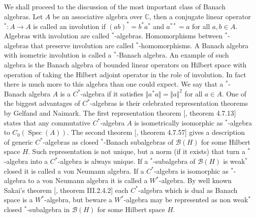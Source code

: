 We shall proceed to the discussion of the most important class of Banach
algebras. Let $A$ be an associative algebra over $\mathbb{C}$, then a conjugate
linear operator ${}^*:A\to A$ is called an involution if ${(ab)}^*=b^*a^*$ and
$a^{**}=a$ for all $a,b\in A$. Algebras with involution are called
${}^*$-algebras. Homomorphisms between ${}^*$-algebras that preserve involution
are called ${}^*$-homomorphisms. A Banach algebra with isometric involution is
called a ${}^*$-Banach algebra. An example of such algebra is the Banach algebra
of bounded linear operators on Hilbert space with operation of taking the
Hilbert adjoint operator in the role of involution. In fact there is much more
to this algebra than one could expect. We say that a ${}^*$-Banach algebra $A$
is a $C^*$-algebra if it satisfies $\Vert a^*a\Vert=\Vert a\Vert^2$ for all
$a\in A$. One of the biggest advantages of $C^*$-algebras is their celebrated
representation theorems by Gelfand and Naimark. The first representation theorem
[\cite{HelBanLocConvAlg}, theorem 4.7.13] states that any commutative
$C^*$-algebra $A$ is isometrically isomorphic as ${}^*$-algebra to
$C_0(\operatorname{Spec}(A))$. The second theorem [\cite{HelBanLocConvAlg},
theorem 4.7.57] gives a description of generic $C^*$-algebras as closed
${}^*$-Banach subalgebras of $\mathcal{B}(H)$ for some Hilbert space $H$. Such
representation is not unique, but a norm (if it exists) that turn a
${}^*$-algebra into a $C^*$-algebra is always unique. If a ${}^*$-subalgebra of
$\mathcal{B}(H)$ is weak${}^*$ closed it is called a von Neumann algebra. If a
$C^*$-algebra is isomorphic as ${}^*$-algebra to a von Neumann algebra it is
called a $W^*$-algebra. By well known Sakai's theorem [\cite{BlackadarOpAlg},
theorem III.2.4.2] each $C^*$-algebra which is dual as Banach space is a
$W^*$-algebra, but beware a $W^*$-algebra may be represented as non weak${}^*$
closed ${}^*$-subalgebra in $\mathcal{B}(H)$ for some Hilbert space $H$. 

